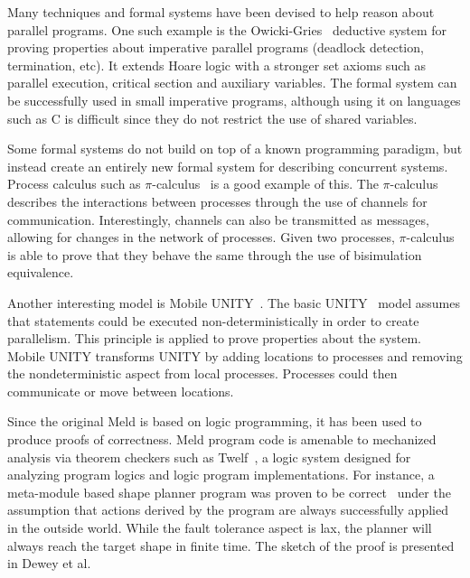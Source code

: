 Many techniques and formal systems have been devised to help reason about parallel programs.
One such example is the Owicki-Gries~\cite{Owicki:1976:VPP:360051.360224} deductive system
for proving properties about imperative parallel programs (deadlock detection, termination, etc).
It extends Hoare logic with a stronger set axioms such as parallel execution, critical section
and auxiliary variables. The formal system can be successfully used in small imperative
programs, although using it on languages such as C is difficult since they do not
restrict the use of shared variables.

Some formal systems do not build on top of a known programming paradigm, but instead
create an entirely new formal system for describing concurrent systems. Process calculus
such as $\pi$-calculus~\cite{Milner:1999:CMS:329902} is a good example of this.
The $\pi$-calculus describes the interactions between processes
through the use of channels for communication. Interestingly, channels can also be transmitted as
messages, allowing for changes in the network of processes.
Given two processes, $\pi$-calculus is able to prove that they behave the same through
the use of bisimulation equivalence.

Another interesting model is Mobile UNITY~\cite{Roman97anintroduction}. The basic UNITY~\cite{UNITY} model assumes that statements could be executed non-deterministically
in order to create parallelism. This principle is applied to prove properties about
the system.
Mobile UNITY transforms UNITY by adding locations to processes and removing the
nondeterministic aspect from local processes. Processes could then communicate or move
between locations.

Since the original Meld is based on logic programming, it has been used to produce proofs of correctness.
Meld program code is amenable to mechanized analysis via theorem checkers such as Twelf~\cite{twelf},
a logic system designed for analyzing program logics and logic program implementations.
For instance, a meta-module based shape planner program was proven to be correct~\cite{dewey-iros08,ashley-rollman-iclp09}
under the assumption that actions derived by the program are always successfully applied in the outside world.
While the fault tolerance aspect is lax, the planner will always reach the target shape in finite time.
The sketch of the proof is presented in Dewey et al.~\cite{dewey-iros08}
